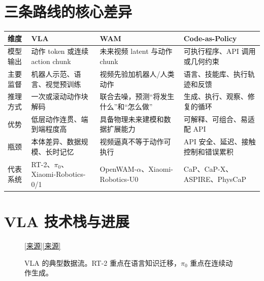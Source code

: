 \documentclass[UTF8,a4paper,11pt]{ctexart}
\newcommand{\source}[1]{\href{#1}{[来源]}}
\begin{document}
\section{三条路线的核心差异}
\begin{longtable}{p{2.8cm}p{3.4cm}p{3.4cm}p{3.4cm}}
\toprule
维度 & VLA & WAM & Code-as-Policy\\\midrule
模型输出 & 动作 token 或连续 action chunk & 未来视频 latent 与动作 chunk & 可执行程序、API 调用或几何约束\\
主要监督 & 机器人示范、语言、视觉预训练 & 视频先验加机器人/人类动作 & 语言、技能库、执行轨迹和反馈\\
推理方式 & 一次或滚动动作块解码 & 联合去噪，预测“将发生什么”和“怎么做” & 生成、执行、观察、修复的循环\\
优势 & 低层动作连贯、端到端程度高 & 具备物理未来建模和数据扩展能力 & 可解释、可组合、易适配 API\\
瓶颈 & 本体差异、数据规模、长时记忆 & 视频逼真不等于动作可执行 & API 安全、延迟、接触控制和错误累积\\
代表系统 & RT-2、$\pi_0$、Xiaomi-Robotics-0/1 & OpenWAM-$\alpha$、Xiaomi-Robotics-U0 & CaP、CaP-X、ASPIRE、PhysCaP\\
\bottomrule
\end{longtable}

\section{VLA 技术栈与进展}
\begin{figure}[ht]
\centering
{}
\caption{VLA 的典型数据流。RT-2 重点在语言知识迁移，$\pi_0$ 重点在连续动作生成。}\source{https://arxiv.org/abs/2307.15818}\;\source{https://www.pi.website/blog/pi0}
\end{figure}
\end{document}
